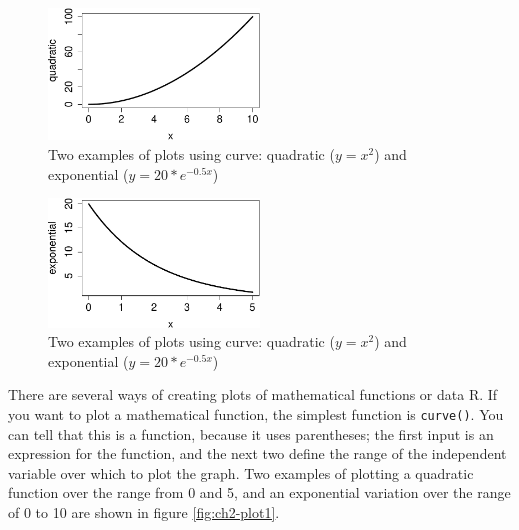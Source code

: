 \documentclass[
  letterpaper,
  DIV=11,
  numbers=noendperiod]{scrreprt}
\begin{document}
\begin{figure}[H]

{\centering \includegraphics[width=0.5\textwidth,height=\textheight]{./functions_files/figure-pdf/ch2-plot1-1.pdf}

}

\caption{Two examples of plots using curve: quadratic (\(y=x^2\)) and
exponential (\(y=20*e^{-0.5x}\))}

\end{figure}

\begin{figure}[H]

{\centering \includegraphics[width=0.5\textwidth,height=\textheight]{./functions_files/figure-pdf/ch2-plot1-2.pdf}

}

\caption{Two examples of plots using curve: quadratic (\(y=x^2\)) and
exponential (\(y=20*e^{-0.5x}\))}

\end{figure}

There are several ways of 
 creating plots of mathematical functions
or data R. If you want to plot a mathematical function, the simplest
function is \texttt{curve()}. You can tell that this is a function,
because it uses parentheses; the first input is an expression for the
function, and the next two define the range of the independent variable
over which to plot the graph. Two examples of plotting a quadratic
function over the range from 0 and 5, and an exponential variation over
the range of 0 to 10 are shown in figure \ref{fig:ch2-plot1}.
\end{document}
